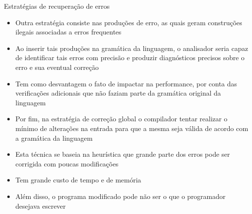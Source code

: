 \begin{frame}[fragile]{Estratégias de recuperação de erros}

    \begin{itemize}
        \item Outra estratégia consiste nas produções de erro, as quais geram construções ilegais associadas a erros frequentes
        \pause

        \item Ao inserir tais produções na gramática da linguagem, o analisador seria capaz de identificar tais erros com precisão e produzir diagnósticos precisos
            sobre o erro e sua eventual correção
        \pause

        \item Tem como desvantagem o fato de impactar na performance, por conta das verificações adicionais que não faziam parte da gramática original da linguagem
        \pause

        \item Por fim, na estratégia de correção global o compilador tentar realizar o mínimo de alterações na entrada para que a mesma seja válida de acordo
            com a gramática da linguagem
        \pause

        \item Esta técnica se baseia na heurística que grande parte dos erros pode ser corrigida com poucas modificações
        \pause

        \item Tem grande custo de tempo e de memória
        \pause

        \item Além disso, o programa modificado pode não ser o que o programador desejava escrever
    \end{itemize}

\end{frame}
